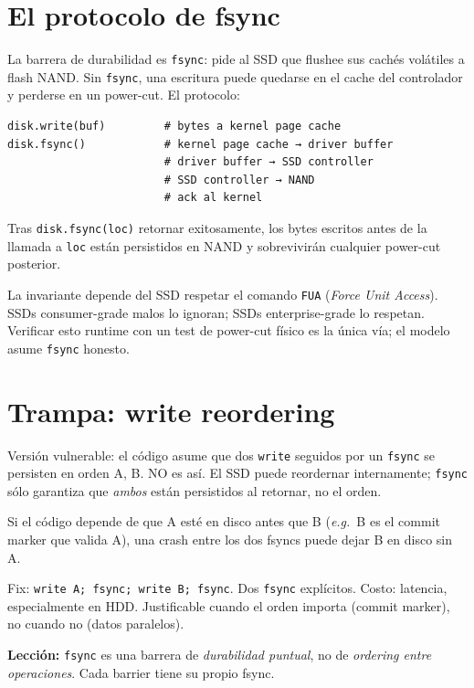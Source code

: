 \section{El protocolo de fsync}

La barrera de durabilidad es \texttt{fsync}: pide al SSD que
flushee sus cachés volátiles a flash NAND. Sin \texttt{fsync},
una escritura puede quedarse en el cache del controlador y
perderse en un power-cut. El protocolo:

\begin{lstlisting}[frame=single, basicstyle=\ttfamily\scriptsize]
disk.write(buf)         # bytes a kernel page cache
disk.fsync()            # kernel page cache → driver buffer
                        # driver buffer → SSD controller
                        # SSD controller → NAND
                        # ack al kernel
\end{lstlisting}

\begin{invariante}
\label{inv:fsync-persist}
Tras \texttt{disk.fsync(loc)} retornar exitosamente, los bytes
escritos antes de la llamada a \texttt{loc} están persistidos en
NAND y sobrevivirán cualquier power-cut posterior.
\end{invariante}

La invariante depende del SSD respetar el comando \texttt{FUA}
(\emph{Force Unit Access}). SSDs consumer-grade malos lo
ignoran; SSDs enterprise-grade lo respetan. Verificar esto
runtime con un test de power-cut físico es la única vía; el
modelo asume \texttt{fsync} honesto.

\section{Trampa: write reordering}

\begin{trampa}
Versión vulnerable: el código asume que dos \texttt{write}
seguidos por un \texttt{fsync} se persisten en orden A, B. NO
es así. El SSD puede reordernar internamente; \texttt{fsync}
sólo garantiza que \emph{ambos} están persistidos al retornar,
no el orden.

Si el código depende de que A esté en disco antes que B (\emph{e.g.}~B
es el commit marker que valida A), una crash entre los dos
fsyncs puede dejar B en disco sin A.

Fix: \texttt{write A; fsync; write B; fsync}. Dos
\texttt{fsync} explícitos. Costo: latencia, especialmente en
HDD. Justificable cuando el orden importa (commit marker), no
cuando no (datos paralelos).

\textbf{Lección:} \texttt{fsync} es una barrera de
\emph{durabilidad puntual}, no de \emph{ordering entre
operaciones}. Cada barrier tiene su propio fsync.
\end{trampa}

